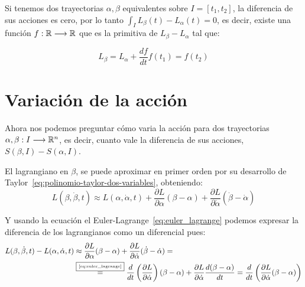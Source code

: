 Si tenemos dos trayectorias $\alpha, \beta$ equivalentes sobre $I=[t_1, t_2]$, la diferencia de sus acciones es cero, por lo tanto $\int_{I} L_\beta(t)-L_\alpha(t)=0$, es decir, existe una función $f:\mathbb{R}\longrightarrow \mathbb{R}$ que es la primitiva de $L_\beta-L_\alpha$ tal que:
\begin{postulate}
    \begin{subequations}
        \begin{equation}
            \label{eq:lagrangiano_trayectorias_equivalentes_1}
            L_\beta=L_\alpha+\frac{df}{dt}
        \end{equation}
        \begin{equation}
            \label{eq:lagrangiano_trayectorias_equivalentes_2}
            f(t_1)=f(t_2)
        \end{equation}
    \end{subequations}
\end{postulate}

\section{Variación de la acción}
Ahora nos podemos preguntar cómo varia la acción para dos trayectorias $\alpha,\beta:I\longrightarrow \mathbb{R}^n$, es decir, cuanto vale la diferencia de sus acciones, $S(\beta, I)-S(\alpha, I)$.

El lagrangiano en $\beta$, se puede aproximar en primer orden por su desarrollo de Taylor~\ref{eq:polinomio-taylor-dos-variables}, obteniendo:
\begin{equation*}
    L(\beta, \dot{\beta}, t)\approx L(\alpha, \dot{\alpha}, t)+\frac{\partial L}{\partial\alpha}(\beta-\alpha)+\frac{\partial L}{\partial\dot{\alpha}}(\dot{\beta}-\dot{\alpha})
\end{equation*}

Y usando la ecuación el Euler-Lagrange~\ref{eq:euler_lagrange} podemos expresar la diferencia de los lagrangianos como un diferencial pues:
\begin{equation}
    \label{variacion-lagrange}
    \begin{align}
        L(\beta, \dot{\beta}, t)- L(\alpha, \dot{\alpha}, t) & \approx\frac{\partial L}{\partial\alpha}(\beta-\alpha)+\frac{\partial L}{\partial\dot{\alpha}}(\dot{\beta}-\dot{\alpha})=\\
        & \overset{\fbox{\tiny \ref{eq:euler_lagrange}}}{=}\frac{d}{dt}\left(\frac{\partial L}{\partial\dot{\alpha}}\right)(\beta-\alpha)+\frac{\partial L}{\partial\dot{\alpha}}\frac{d(\beta-\alpha)}{dt} =\frac{d}{dt}\left(\frac{\partial L}{\partial\dot{\alpha}}(\beta-\alpha)\right)
    \end{align}
\end{equation}


